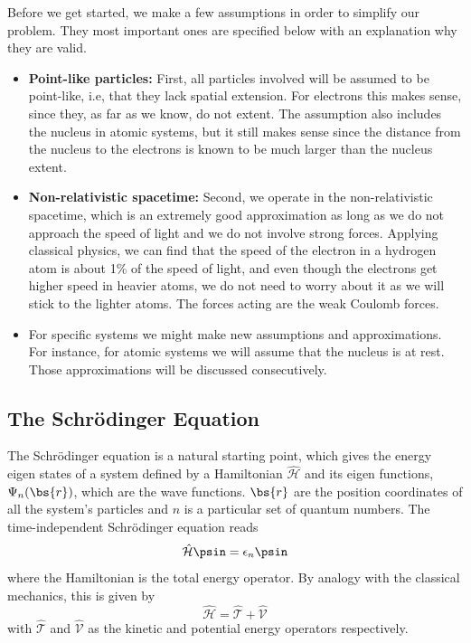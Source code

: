 Before we get started, we make a few assumptions in order to simplify our problem. They most important ones are specified below with an explanation why they are valid.

\begin{itemize}
	\item \textbf{Point-like particles:} First, all particles involved will be assumed to be point-like, i.e, that they lack spatial extension. For electrons this makes sense, since they, as far as we know, do not extent. The assumption also includes the nucleus in atomic systems, but it still makes sense since the distance from the nucleus to the electrons is known to be much larger than the nucleus extent.
	
	\item \textbf{Non-relativistic spacetime:}  Second, we operate in the non-relativistic spacetime, which is an extremely good approximation as long as we do not approach the speed of light and we do not involve strong forces. Applying classical physics, we can find that the speed of the electron in a hydrogen atom is about 1\% of the speed of light, and even though the electrons get higher speed in heavier atoms, we do not need to worry about it as we will stick to the lighter atoms. The forces acting are the weak Coulomb forces.
	
	\item For specific systems we might make new assumptions and approximations. For instance, for atomic systems we will assume that the nucleus is at rest. Those approximations will be discussed consecutively. 
\end{itemize}

\subsection{The Schrödinger Equation} \label{subsec:schrodinger}
The Schrödinger equation is a natural starting point, which gives the energy eigen states of a system defined by a Hamiltonian $\hat{\mathcal{H}}$ and its eigen functions, $\Psi_n(\bs{r})$, which are the wave functions. $\bs{r}$ are the position coordinates of all the system's particles and $n$ is a particular set of quantum numbers. The time-independent Schrödinger equation reads
\begin{equation}
\label{eq:Energy}
 \hat{\mathcal{H}}\psin=\epsilon_n\psin
\end{equation}
where the Hamiltonian is the total energy operator. By analogy with the classical mechanics, this is given by
\begin{equation}
\hat{\mathcal{H}}=\hat{\mathcal{T}}+\hat{\mathcal{V}}
\end{equation}
with $\hat{\mathcal{T}}$ and $\hat{\mathcal{V}}$ as the kinetic and potential energy operators respectively. 

